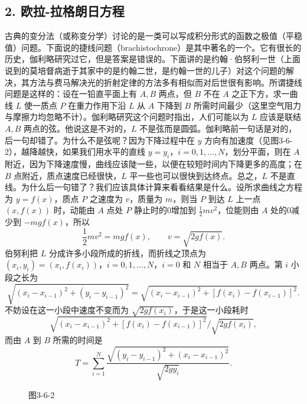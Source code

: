 \subsection*{2. 欧拉-拉格朗日方程}

古典的变分法（或称变分学）讨论的是一类可以写成积分形式的函数之极值（平稳值）问题。下面说的捷线问题（brachistochrone）是其中著名的一个。它有很长的历史，伽利略研究过它，但是答案是错误的。下面讲的是约翰·伯努利一世（上面说到的莫培督病逝于其家中的是约翰二世，是约翰一世的儿子）对这个问题的解决，其方法与费马解决光的折射定律的方法多有相似而对后世很有影响。所谓捷线问题是这样的：设在一铅直平面上有 $A,B$ 两点，但 $B$ 不在 $A$ 之正下方，求一曲线 $L$ 使一质点 $P$ 在重力作用下沿 $L$ 从 $A$ 下降到 $B$ 所需时间最少（这里空气阻力与摩擦力均忽略不计）。伽利略研究这个问题时指出，人们可能以为 $L$ 应该是联结 $A,B$ 两点的弦。他说这是不对的，$L$ 不是弦而是圆弧。伽利略前一句话是对的，后一句却错了。为什么不是弦呢？因为下降过程中在 $y$ 方向有加速度（见图3-6-2），越降越快，如果我们用水平的直线 $y=y_i$，$i=0,1,\ldots,N$，划分平面，则在 $A$ 附近，因为下降速度慢，曲线应该陡一些，以便在较短时间内下降更多的高度；在 $B$ 点附近，质点速度已经很快，$L$ 平一些也可以很快到达终点。总之，$L$ 不是直线。为什么后一句错了？我们应该具体计算来看看结果是什么。设所求曲线之方程为 $y=f(x)$，质点 $P$ 之速度为 $v$，质量为 $m$，则当 $P$ 到达 $L$ 上一点 $(x,f(x))$ 时，动能由 $A$ 点处 $P$ 静止时的0增加到 $\frac12mv^2$，位能则由 $A$ 处的0减少到 $-mgf(x)$，所以
\[
 \frac12mv^2=mgf(x),\qquad v=\sqrt{2gf(x)}.
\]
伯努利把 $L$ 分成许多小段所成的折线，而折线之顶点为 $(x_i,y_i)=(x_i,f(x_i))$，$i=0,1,\ldots,N$，$i=0$ 和 $N$ 相当于 $A,B$ 两点。第 $i$ 小段之长为
\[
 \sqrt{(x_i-x_{i-1})^2+(y_i-y_{i-1})^2}
 =\sqrt{(x_i-x_{i-1})^2+[f(x_i)-f(x_{i-1})]^2}.
\]
不妨设在这一小段中速度不变而为 $\sqrt{2gf(x_i)}$，于是这一小段耗时
\[
 \sqrt{(x_i-x_{i-1})^2+[f(x_i)-f(x_{i-1})]^2}/\sqrt{2gf(x_i)},
\]
而由 $A$ 到 $B$ 所需的时间是
\[
 T=\sum_{i=1}^{N}
 \frac{\sqrt{(y_i-y_{i-1})^2+(x_i-x_{i-1})^2}}{\sqrt{2gy_i}}.
\]

\begin{figure}[htbp]
\centering
{}
\caption*{图3-6-2}
\end{figure}

